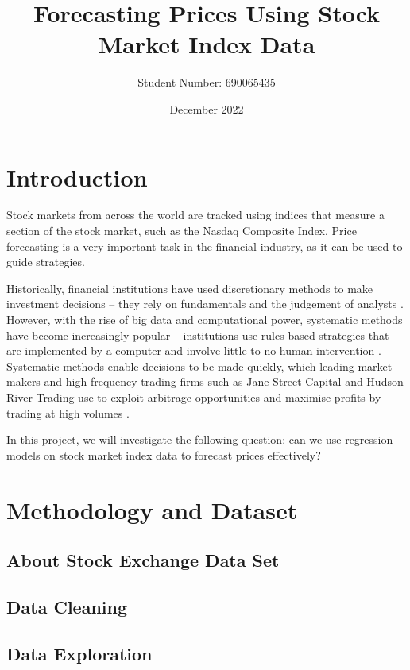 \documentclass[a4paper, 11pt]{article}
\begin{document}
\title{Forecasting Prices Using Stock Market Index Data}
\author{Student Number: 690065435}
\date{December 2022}
\maketitle

\section{Introduction}
Stock markets from across the world are tracked using indices that measure a section of the stock market, such as the Nasdaq Composite Index. Price forecasting is a very important task in the financial industry, as it can be used to guide strategies.

Historically, financial institutions have used discretionary methods to make investment decisions -- they rely on fundamentals and the judgement of analysts \cite{harvey2017man}. However, with the rise of big data and computational power, systematic methods have become increasingly popular -- institutions use rules-based strategies that are implemented by a computer and involve little to no human intervention \cite{harvey2017man}. Systematic methods enable decisions to be made quickly, which leading market makers and high-frequency trading firms such as Jane Street Capital and Hudson River Trading use to exploit arbitrage opportunities and maximise profits by trading at high volumes \cite{aldridge2013high}.

In this project, we will investigate the following question: can we use regression models on stock market index data to forecast prices effectively?

\section{Methodology and Dataset}

\subsection{About Stock Exchange Data Set}

\subsection{Data Cleaning}

\subsection{Data Exploration}
\end{document}
